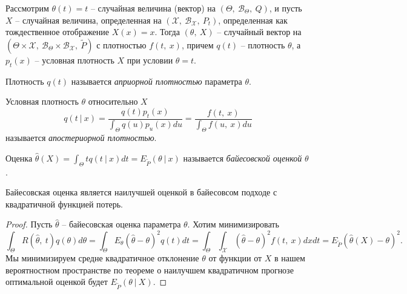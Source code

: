 Рассмотрим $\displaystyle \theta ( t) =t$ -- случайная величина (вектор) на $\displaystyle ( \Theta ,\ \mathcal{B}_{\Theta } ,\ Q)$, и пусть $\displaystyle X$ -- случайная величина, определенная на $\displaystyle (\mathcal{X} ,\ \mathcal{B}_{\mathcal{X}} ,\ P_{t})$, определенная как тождественное отображение $\displaystyle X( x) =x$. Тогда $\displaystyle ( \theta ,\ X)$ -- случайный вектор на $\displaystyle \left( \Theta \times \mathcal{X} ,\ \mathcal{B}_{\Theta } \times \mathcal{B}_{\mathcal{X}} ,\ \tilde{P}\right)$ с плотностью $\displaystyle f( t,\ x)$, причем $\displaystyle q( t)$ -- плотность $\displaystyle \theta $, а $\displaystyle p_{t}( x)$ -- условная плотность $\displaystyle X$ при условии $\displaystyle \theta =t$.
\begin{definition}
    Плотность $\displaystyle q( t)$ называется \textit{априорной плотностью} параметра $\displaystyle \theta $.
\end{definition}
\begin{definition}
    Условная плотность $\displaystyle \theta $ относительно $\displaystyle X$
    \begin{equation*}
        q( t\ |\ x) =\dfrac{q( t) p_{t}( x)}{\int _{\Theta } q( u) p_{u}( x) du} =\dfrac{f( t,\ x)}{\int _{\Theta } f( u,\ x) du}
    \end{equation*}
    называется \textit{апостериорной плотностью}.
\end{definition}
\begin{definition}
    Оценка $\displaystyle \hat{\theta }( X) =\int _{\Theta } tq( t\ |\ x) dt=E_{\tilde{P}}( \theta \ |\ x)$ называется \textit{байесовской оценкой} $\displaystyle \theta $.
\end{definition}
\begin{theorem}
    Байесовская оценка является наилучшей оценкой в байесовсом подходе с квадратичной функцией потерь.
\end{theorem}
\begin{proof}
    Пусть $\displaystyle \hat{\theta }$ -- байесовская оценка параметра $\displaystyle \theta $. Хотим минимизировать
    \begin{equation*}
        \int _{\Theta } R(\hat{\theta } ,\ t) q( \theta ) d\theta =\int _{\Theta } E_{\theta }(\hat{\theta } -\theta )^{2} q( t) dt=\int _{\Theta }\int _{\mathcal{X}}(\hat{\theta } -\theta )^{2} f( t,\ x) dxdt=E_{\tilde{P}}(\hat{\theta }( X) -\theta )^{2} .
    \end{equation*}
    Мы минимизируем средне квадратичное отклонение $\displaystyle \theta $ от функции от $\displaystyle X$ в нашем вероятностном пространстве по теореме о наилучшем квадратичном прогнозе оптимальной оценкой будет $\displaystyle E_{\tilde{P}}( \theta \ |\ X)$.
\end{proof}
